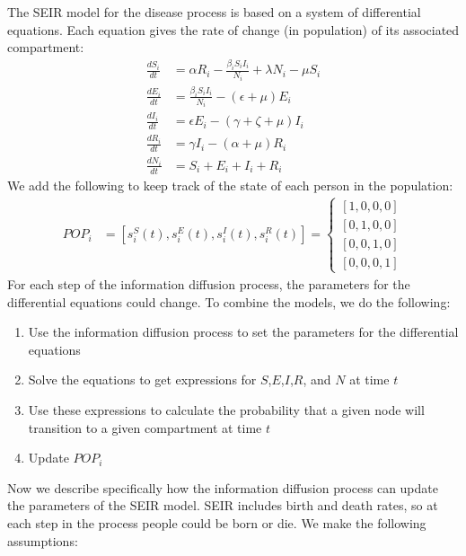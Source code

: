 \documentclass[conference]{IEEEtran}
\begin{document}
The SEIR model for the disease process is based on a system of differential equations. Each equation gives the rate of change (in population) of its associated compartment:
\begin{align}
    \frac{dS_{i}}{dt} &= \alpha R_{i} - \frac{\beta_{i} S_{i} I_{i}}{N_{i}} + \lambda N_{i} - \mu S_{i}\\
    \frac{dE_{i}}{dt} &= \frac{\beta_{i} S_{i} I_{i}}{N_{i}} - (\epsilon + \mu ) E_{i}\\
    \frac{dI_{i}}{dt} &= \epsilon E_{i} - (\gamma + \zeta + \mu)I_{i}\\
    \frac{dR_{i}}{dt} &= \gamma I_{i} - (\alpha + \mu)R_{i}\\
    \frac{dN_{i}}{dt} &= S_{i} + E_{i} + I_{i} + R_{i}
\end{align}
We add the following to keep track of the state of each person in the population:
\begin{align}
    POP_{i} &= \left[ s^{S}_{i}(t),s^{E}_{i}(t),s^{I}_{i}(t),s^{R}_{i}(t) \right] = \left\{ \begin{matrix}
    \left[1,0,0,0\right]\\
    \left[0,1,0,0\right]\\
    \left[0,0,1,0\right]\\
    \left[0,0,0,1\right]
    \end{matrix}
    \right.
\end{align}
For each step of the information diffusion process, the parameters for the differential equations could change. To combine the models, we do the following:
\begin{enumerate}
    \item Use the information diffusion process to set the parameters for the differential equations
    \item Solve the equations to get expressions for $S$,$E$,$I$,$R$, and $N$ at time $t$
    \item Use these expressions to calculate the probability that a given node will transition to a given compartment at time $t$
    \item Update $POP_{i}$
\end{enumerate}
Now we describe specifically how the information diffusion process can update the parameters of the SEIR model. SEIR includes birth and death rates, so at each step in the process people could be born or die. We make the following assumptions:
\end{document}
